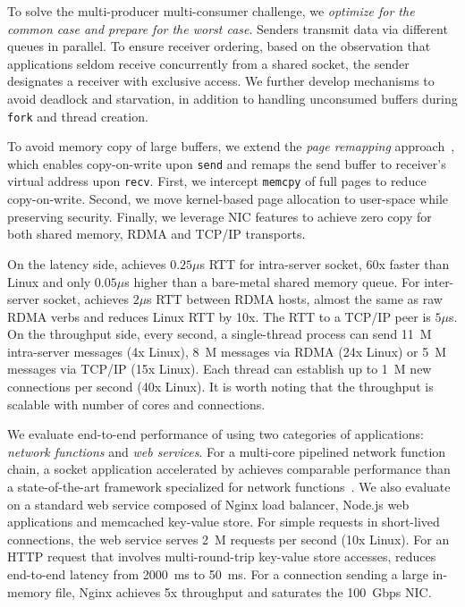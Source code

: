 To solve the multi-producer multi-consumer challenge, we \textit{optimize for the common case and prepare for the worst case}. Senders transmit data via different queues in parallel. To ensure receiver ordering, based on the observation that applications seldom receive concurrently from a shared socket, the sender designates a receiver with exclusive access. We further develop mechanisms to avoid deadlock and starvation, in addition to handling unconsumed buffers during \texttt{fork} and thread creation.

To avoid memory copy of large buffers, we extend the \textit{page remapping} approach~\cite{thadani1995efficient,chu1996zero}, which enables copy-on-write upon \texttt{send} and remaps the send buffer to receiver's virtual address upon \texttt{recv}. First, we intercept \texttt{memcpy} of full pages to reduce copy-on-write. Second, we move kernel-based page allocation to user-space while preserving security. Finally, we leverage NIC features to achieve zero copy for both shared memory, RDMA and TCP/IP transports.

On the latency side, \sys{} achieves $0.25\mu$s RTT for intra-server socket, 60x faster than Linux and only $0.05\mu$s higher than a bare-metal shared memory queue. For inter-server socket, \sys{} achieves $2\mu$s RTT between RDMA hosts, almost the same as raw RDMA verbs and reduces Linux RTT by 10x. The RTT to a TCP/IP peer is $5\mu$s. On the throughput side, every second, a single-thread process can send 11~M intra-server messages (4x Linux), 8~M messages via RDMA (24x Linux) or 5~M messages via TCP/IP (15x Linux). Each thread can establish up to 1~M new connections per second (40x Linux). It is worth noting that the throughput is scalable with number of cores and connections.

We evaluate end-to-end performance of \sys{} using two categories of applications: \textit{network functions} and \textit{web services}. For a multi-core pipelined network function chain, a socket application accelerated by \sys{} achieves comparable performance than a state-of-the-art framework specialized for network functions~\cite{panda2016netbricks}. We also evaluate \sys{} on a standard web service composed of Nginx load balancer, Node.js web applications and memcached key-value store. For simple requests in short-lived connections, the web service serves 2~M requests per second (10x Linux). For an HTTP request that involves multi-round-trip key-value store accesses, \sys{} reduces end-to-end latency from 2000~ms to 50~ms. For a connection sending a large in-memory file, Nginx achieves 5x throughput and saturates the 100~Gbps NIC.
